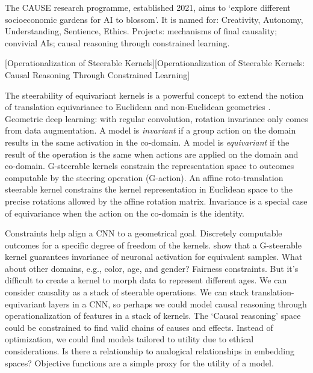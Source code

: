 The CAUSE research programme, established 2021, aims to `explore different
socioeconomic gardens for AI to blossom'.
It is named for: Creativity, Autonomy, Understanding, Sentience, Ethics.
Projects: mechanisms of final causality; convivial AIs; causal reasoning through
constrained learning.

[Operationalization of Steerable Kernels][{Operationalization of Steerable Kernels: Causal Reasoning Through Constrained Learning}]
\begin{affils}
\end{affils}

The steerability of equivariant kernels is a powerful concept to extend the notion of
translation equivariance to Euclidean and non-Euclidean geometries
\parencites{Weiler2019}{Cesa2022}.
Geometric deep learning: with regular convolution, rotation invariance only comes from
data augmentation.
A model is \emph{invariant} if a group action on the domain results in the same
activation in the co-domain.
A model is \emph{equivariant} if the result of the operation is the same when actions
are applied on the domain and co-domain.
G-steerable kernels constrain the representation space to outcomes computable by the
steering operation (G-action).
An affine roto-translation steerable kernel constrains the kernel representation in
Euclidean space to the precise rotations allowed by the affine rotation matrix.
Invariance is a special case of equivariance when the action on the co-domain is the
identity.

Constraints help align a CNN to a geometrical goal.
Discretely computable outcomes for a specific degree of freedom of the kernels.
\textcites{Weiler2019} show that a G-steerable kernel guarantees invariance of neuronal
activation for equivalent samples.
What about other domains, e.g., color, age, and gender?
Fairness constraints.
But it's difficult to create a kernel to morph data to represent different ages.
We can consider causality as a stack of steerable operations.
We can stack translation-equivariant layers in a CNN, so perhaps we could model causal
reasoning through operationalization of features in a stack of kernels.
The `Causal reasoning' space could be constrained to find valid chains of causes and
effects.
Instead of optimization, we could find models tailored to utility due to ethical
considerations.
Is there a relationship to analogical relationships in embedding spaces?
Objective functions are a simple proxy for the utility of a model.
